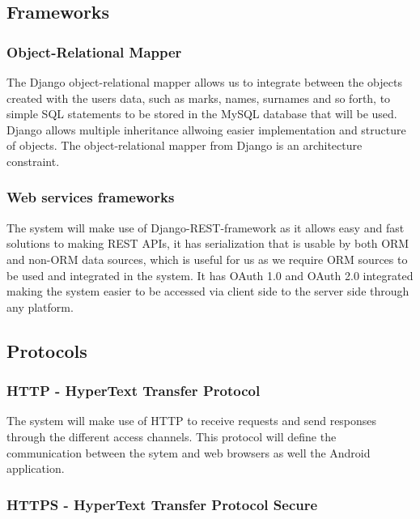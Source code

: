 \subsection{Frameworks}

\subsubsection{Object-Relational Mapper}

The Django object-relational mapper allows us to integrate between the objects created with the users data, such as marks, names, surnames and so forth, to simple SQL statements to be stored in the MySQL database that will be used. Django allows multiple inheritance allwoing easier implementation and structure of objects. The object-relational mapper from Django is an architecture constraint.  

\subsubsection{Web services frameworks}

The system will make use of Django-REST-framework as it allows easy and fast solutions to making REST APIs, it has serialization that is usable by both ORM and non-ORM data sources, which is useful for us as we require ORM sources to be used and integrated in the system. It has OAuth 1.0 and OAuth 2.0 integrated making the system easier to be accessed via client side to the server side through any platform.

\subsection{Protocols}

\subsubsection{HTTP - HyperText Transfer Protocol}

The system will make use of HTTP to receive requests and send responses through the different access channels. This protocol will define the communication 
between the sytem and web browsers as well the Android application.

\subsubsection{HTTPS - HyperText Transfer Protocol Secure}


